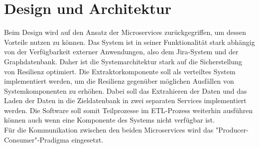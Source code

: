 \section{Design und Architektur}
Beim Design wird auf den Ansatz der Microservices zurückgegriffen, um dessen Vorteile nutzen zu können. Das System ist in seiner Funktionalität stark abhängig von der Verfügbarkeit externer Anwendungen, also dem Jira-System und der Graphdatenbank. Daher ist die Systemarchitektur stark auf die Sicherstellung von Resilienz optimiert. Die Extraktorkomponente soll als verteiltes System implementiert werden, um die Resilienz gegenüber möglichen Ausfällen von Systemkomponenten zu erhöhen. Dabei soll das Extrahieren der Daten und das Laden der Daten in die Zieldatenbank in zwei separaten Services implementiert werden. Die Software soll somit Teilprozesse im ETL-Prozess weiterhin ausführen können auch wenn eine Komponente des Systems nicht verfügbar ist.\\
Für die Kommunikation zwischen den beiden Microservices wird das "Producer-Consumer"-Pradigma eingesetzt.

